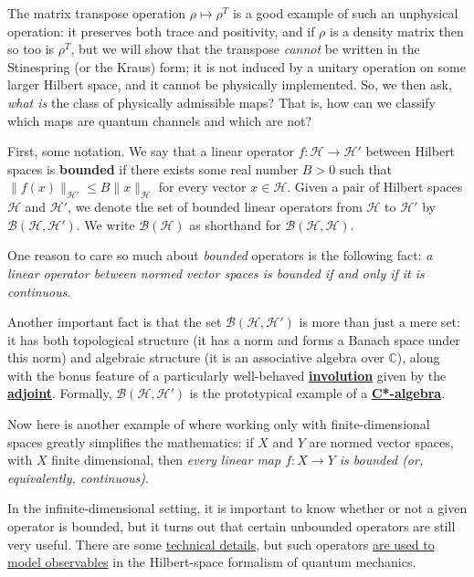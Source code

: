 \documentclass[fleqn]{article}
\newenvironment{technical}{\noindent}{\medskip}
\begin{document}
The matrix transpose operation \(\rho\mapsto\rho^T\) is a good example of such an unphysical operation: it preserves both trace and positivity, and if \(\rho\) is a density matrix then so too is \(\rho^T\), but we will show that the transpose \emph{cannot} be written in the Stinespring (or the Kraus) form;
it is not induced by a unitary operation on some larger Hilbert space, and it cannot be physically implemented.
So, we then ask, \emph{what is} the class of physically admissible maps?
That is, how can we classify which maps are quantum channels and which are not?

First, some notation.
We say that a linear operator \(f\colon\mathcal{H}\to\mathcal{H}'\) between Hilbert spaces is \textbf{bounded} if there exists some real number \(B>0\) such that \(\|f(x)\|_{\mathcal{H}'}\leqslant B\|x\|_{\mathcal{H}}\) for every vector \(x\in\mathcal{H}\).
Given a pair of Hilbert spaces \(\mathcal{H}\) and \(\mathcal{H}'\), we denote the set of bounded linear operators from \(\mathcal{H}\) to \(\mathcal{H}'\) by \(\mathcal{B}(\mathcal{H},\mathcal{H}')\).
We write \(\mathcal{B}(\mathcal{H})\) as shorthand for \(\mathcal{B(H,H)}\).

\begin{technical}
One reason to care so much about \emph{bounded} operators is the following fact: \emph{a linear operator between normed vector spaces is bounded if and only if it is continuous}.

Another important fact is that the set \(\mathcal{B}(\mathcal{H},\mathcal{H}')\) is more than just a mere set: it has both topological structure (it has a norm and forms a Banach space under this norm) and algebraic structure (it is an associative algebra over \(\mathbb{C}\)), along with the bonus feature of a particularly well-behaved \href{https://en.wikipedia.org/wiki/Involution_(mathematics)}{\textbf{involution}} given by the \href{https://en.wikipedia.org/wiki/Hermitian_adjoint}{\textbf{adjoint}}.
Formally, \(\mathcal{B}(\mathcal{H},\mathcal{H}')\) is the prototypical example of a \href{https://en.wikipedia.org/wiki/C*-algebra}{\textbf{C*-algebra}}.

Now here is another example of where working only with finite-dimensional spaces greatly simplifies the mathematics: if \(X\) and \(Y\) are normed vector spaces, with \(X\) finite dimensional, then \emph{every linear map \(f\colon X\to Y\) is bounded (or, equivalently, continuous)}.

In the infinite-dimensional setting, it is important to know whether or not a given operator is bounded, but it turns out that certain unbounded operators are still very useful.
There are some \href{https://en.wikipedia.org/wiki/Unbounded_operator}{technical details}, but such operators \href{https://en.wikipedia.org/wiki/Hilbert_space\#Unbounded_operators}{are used to model observables} in the Hilbert-space formalism of quantum mechanics.

\end{technical}
\end{document}
